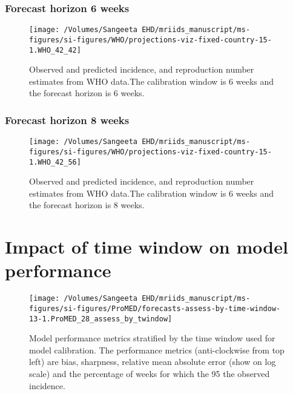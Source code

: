 \documentclass[9pt,twoside,lineno]{pnas-new}
\begin{document}
\hypertarget{forecast-horizon-6-weeks-8}{%
  \subsubsection{Forecast horizon 6
    weeks}\label{forecast-horizon-6-weeks-8}}

\begin{figure}

  {\centering \texttt{[image: /Volumes/Sangeeta EHD/mriids\_manuscript/ms-figures/si-figures/WHO/projections-viz-fixed-country-15-1.WHO\_42\_42]} 

  }

  \caption{Observed and predicted incidence, and reproduction number estimates from WHO data.The calibration window is 6 weeks and the forecast horizon is 6 weeks.}\label{fig:SI-29}
\end{figure}

\hypertarget{forecast-horizon-8-weeks-8}{%
  \subsubsection{Forecast horizon 8
    weeks}\label{forecast-horizon-8-weeks-8}}

\begin{figure}

  {\centering \texttt{[image: /Volumes/Sangeeta EHD/mriids\_manuscript/ms-figures/si-figures/WHO/projections-viz-fixed-country-15-1.WHO\_42\_56]} 

  }

  \caption{Observed and predicted incidence, and reproduction number estimates from WHO data.The calibration window is 6 weeks and the forecast horizon is 8 weeks.}\label{fig:SI-30}
\end{figure}

\hypertarget{impact-of-time-window-on-model-performance}{%
  \section{Impact of time window on model
    performance}\label{impact-of-time-window-on-model-performance}}

\begin{figure}

  {\centering \texttt{[image: /Volumes/Sangeeta EHD/mriids\_manuscript/ms-figures/si-figures/ProMED/forecasts-assess-by-time-window-13-1.ProMED\_28\_assess\_by\_twindow]} 

  }

  \caption{Model performance metrics stratified by the time window used for
    model calibration. The performance metrics (anti-clockwise from top left) are
    bias, sharpness, relative mean absolute error (show on log scale) and
    the percentage of weeks for which the 95%
    the observed incidence.}
  \label{fig:perftw}
\end{figure}
\end{document}
